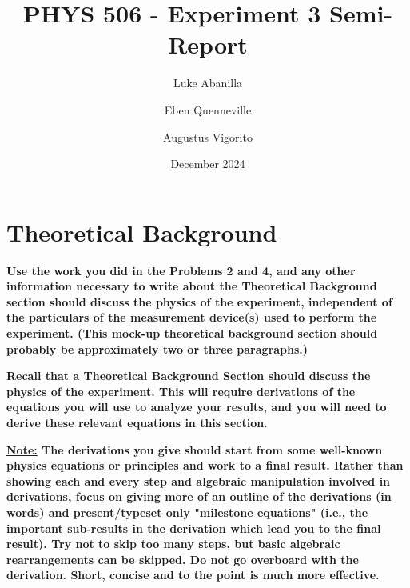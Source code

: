 \documentclass[prX,nofootinbib,notitlepage]{revtex4-1}
\begin{document}



\title{PHYS 506 - Experiment 3 Semi-Report}

\author{Luke Abanilla}
\author{Eben Quenneville}
\author{Augustus Vigorito}
\date{December 2024}

\maketitle

\section{Theoretical Background}

\textbf{Use the work you did in the Problems 2 and 4, and any other information necessary to write about the Theoretical Background section should discuss the physics of the experiment, independent of the particulars of the measurement device(s) used to perform the experiment. (This mock-up theoretical background section should probably be approximately two or three paragraphs.)}

\textbf{Recall that a Theoretical Background Section should discuss the physics of the experiment. This will require derivations of the equations you will use to analyze your results, and you will need to derive these relevant equations in this section.}

\textbf{ \underline{Note:} The derivations you give should start from some well-known physics equations or principles and work to a final result. Rather than showing each and every step and algebraic manipulation involved in derivations, focus on giving more of an outline of the derivations (in words) and present/typeset only "milestone equations" (i.e., the important sub-results in the  derivation which lead you to the final result). Try not to skip too many steps, but basic algebraic rearrangements can be skipped. Do not go overboard with the derivation. Short, concise and to the point is much more effective.}
\end{document}
